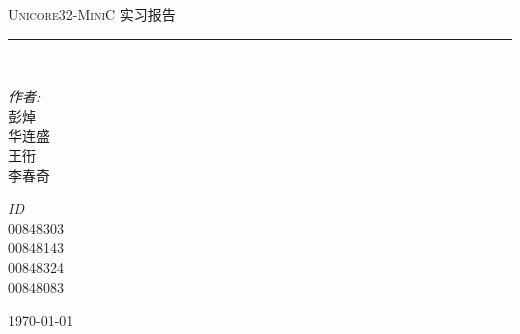 \newcommand{\HRule}{\rule{\linewidth}{0.5mm}}
\begin{titlepage}
	\begin{center}
		\phantom{placeholder}
		\vspace{6cm}
		\textsc{\LARGE Unicore32-MiniC }{\LARGE 实习报告}\\[2cm]
		\HRule\\[5cm]
		\begin{minipage}{0.4\textwidth}
			\begin{center} \large
				\emph{作者:}\\
				彭焯\\
				华连盛\\ 
				王衎\\
				李春奇\\ 
			\end{center}
		\end{minipage}
		\begin{minipage}{0.4\textwidth}
			\begin{center} \large
				\emph{ID} \\
				00848303\\
				00848143\\
				00848324\\
				00848083\\
			\end{center}
		\end{minipage}

		\vfill

		{\large \today}

	\end{center}

\end{titlepage}
